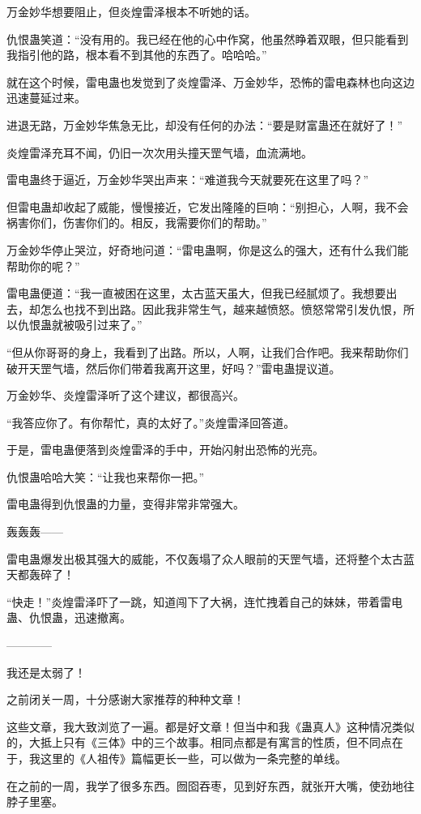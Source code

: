 \begin{this_body}
万金妙华想要阻止，但炎煌雷泽根本不听她的话。

仇恨蛊笑道：“没有用的。我已经在他的心中作窝，他虽然睁着双眼，但只能看到我指引他的路，根本看不到其他的东西了。哈哈哈。”

就在这个时候，雷电蛊也发觉到了炎煌雷泽、万金妙华，恐怖的雷电森林也向这边迅速蔓延过来。

进退无路，万金妙华焦急无比，却没有任何的办法：“要是财富蛊还在就好了！”

炎煌雷泽充耳不闻，仍旧一次次用头撞天罡气墙，血流满地。

雷电蛊终于逼近，万金妙华哭出声来：“难道我今天就要死在这里了吗？”

但雷电蛊却收起了威能，慢慢接近，它发出隆隆的巨响：“别担心，人啊，我不会祸害你们，伤害你们的。相反，我需要你们的帮助。”

万金妙华停止哭泣，好奇地问道：“雷电蛊啊，你是这么的强大，还有什么我们能帮助你的呢？”

雷电蛊便道：“我一直被困在这里，太古蓝天虽大，但我已经腻烦了。我想要出去，却怎么也找不到出路。因此我非常生气，越来越愤怒。愤怒常常引发仇恨，所以仇恨蛊就被吸引过来了。”

“但从你哥哥的身上，我看到了出路。所以，人啊，让我们合作吧。我来帮助你们破开天罡气墙，然后你们带着我离开这里，好吗？”雷电蛊提议道。

万金妙华、炎煌雷泽听了这个建议，都很高兴。

“我答应你了。有你帮忙，真的太好了。”炎煌雷泽回答道。

于是，雷电蛊便落到炎煌雷泽的手中，开始闪射出恐怖的光亮。

仇恨蛊哈哈大笑：“让我也来帮你一把。”

雷电蛊得到仇恨蛊的力量，变得非常非常强大。

轰轰轰——

雷电蛊爆发出极其强大的威能，不仅轰塌了众人眼前的天罡气墙，还将整个太古蓝天都轰碎了！

“快走！”炎煌雷泽吓了一跳，知道闯下了大祸，连忙拽着自己的妹妹，带着雷电蛊、仇恨蛊，迅速撤离。

------------

我还是太弱了！

之前闭关一周，十分感谢大家推荐的种种文章！

这些文章，我大致浏览了一遍。都是好文章！但当中和我《蛊真人》这种情况类似的，大抵上只有《三体》中的三个故事。相同点都是有寓言的性质，但不同点在于，我这里的《人祖传》篇幅更长一些，可以做为一条完整的单线。

在之前的一周，我学了很多东西。囫囵吞枣，见到好东西，就张开大嘴，使劲地往脖子里塞。


\end{this_body}
